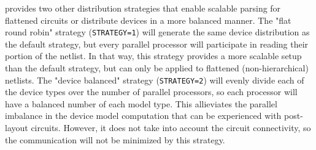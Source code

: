 \Xyce{} provides two other distribution strategies that enable scalable parsing for
flattened circuits or distribute devices in a more balanced manner.  The "flat round robin" strategy
(\texttt{STRATEGY=1}) will generate the same device distribution as the default strategy, but every
parallel processor will participate in reading their portion of the netlist.  In that way, this
strategy provides a more scalable setup than the default strategy, but can only be applied to flattened
(non-hierarchical) netlists.  The "device balanced" strategy (\texttt{STRATEGY=2}) will evenly divide
each of the device types over the number of parallel processors, so each processor will have a balanced
number of each model type.  This allieviates the parallel imbalance in the device model computation that
can be experienced with post-layout circuits.  However, it does not take into account the circuit
connectivity, so the communication will not be minimized by this strategy.





